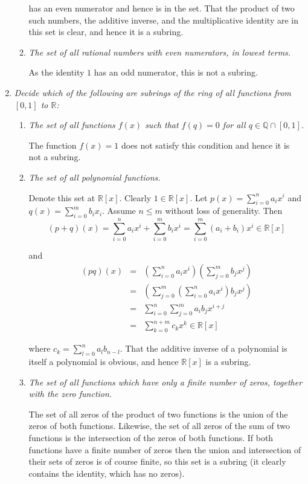 \documentclass[letterpaper, 11pt]{article}
\newcommand{\Q}{\mathbb{Q}}
\newcommand{\R}{\mathbb{R}}
\begin{document}
\begin{enumerate}
\begin{enumerate}
has an even numerator and hence is in the set.  That the product of two such numbers, the additive inverse, and the multiplicative identity are in this set is clear, and hence it is a subring.

\item \emph{The set of all rational numbers with even numerators, in lowest terms.}

As the identity $1$ has an odd numerator, this is not a subring.

\end{enumerate}
\item \emph{Decide which of the following are subrings of the ring of all functions from $[0,1]$ to $\R$:}
\begin{enumerate}
\item \emph{The set of all functions $f(x)$ such that $f(q)=0$ for all $q \in \Q \cap [0,1]$.}

The function $f(x)=1$ does not satisfy this condition and hence it is not a subring.

\item \emph{The set of all polynomial functions.}

Denote this set at $\R[x]$.  Clearly $1 \in \R[x]$.  Let $p(x) = \sum_{i=0}^n a_ix^i$ and $q(x) = \sum_{i=0}^m b_ix_i$.  Assume $n \leq m$ without loss of generality.  Then
\[
(p+q)(x) = \sum_{i=0}^n a_ix^i + \sum_{i=0}^m b_ix^i = \sum_{i=0}^m (a_i + b_i)x^i \in \R[x]
\]

and
\begin{eqnarray*}
(pq)(x) &=& \left(\sum_{i=0}^n a_ix^i\right)\left(\sum_{j=0}^m b_jx^j\right) \\
&=& \left(\sum_{j=0}^m \left(\sum_{i=0}^n a_ix^i\right)b_jx^j\right) \\
&=& \sum_{i=0}^n\sum_{j=0}^m a_ib_jx^{i+j} \\
&=& \sum_{k=0}^{n+m} c_k x^k \in \R[x]
\end{eqnarray*}

where $c_k = \sum_{l=0}^n a_lb_{n-l}$.  That the additive inverse of a polynomial is itself a polynomial is obvious, and hence $\R[x]$ is a subring.

\item \emph{The set of all functions which have only a finite number of zeros, together with the zero function.}

The set of all zeros of the product of two functions is the union of the zeros of both functions.  Likewise, the set of all zeros of the sum of two functions is the intersection of the zeros of both functions.  If both functions have a finite number of zeros then the union and intersection of their sets of zeros is of course finite, so this set is a subring (it clearly contains the identity, which has no zeros).


\end{enumerate}
\end{enumerate}
\end{document}
